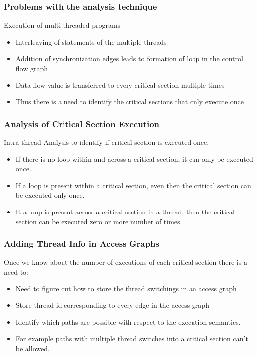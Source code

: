 \documentclass{beamer}
\begin{document}
\begin{frame}
	\frametitle{Problems with the analysis technique}
	Execution of multi-threaded programs
	\begin{itemize}
		\item Interleaving of statements of the multiple threads
		\item Addition of synchronization edges leads to formation of loop in the control flow graph
		\item Data flow value is transferred to every critical section multiple times
		\item Thus there is a need to identify the critical sections that only execute once
	\end{itemize}
\end{frame}

\begin{frame}
	\frametitle{Analysis of Critical Section Execution}
	Intra-thread Analysis to identify if critical section is executed once. 
	\begin{itemize}
		\item If there is no loop within and across a critical section, it can only be executed once.
		\item If a loop is present within a critical section, even then the critical section can be executed only once.
		\item It a loop is present across a critical section in a thread, then the critical section can be executed zero or more number of times.
	\end{itemize}
\end{frame}

\begin{frame}
	\frametitle{Adding Thread Info in Access Graphs}
	Once we know about the number of executions of each critical section there is a need to:  
	\begin{itemize}
		\item Need to figure out how to store the thread switchings in an access graph
		\item Store thread id corresponding to every edge in the access graph
		\item Identify which paths are possible with respect to the execution semantics.
		\item For example paths with multiple thread switches into a critical section can't be allowed.  
	\end{itemize}
\end{frame}
\end{document}
